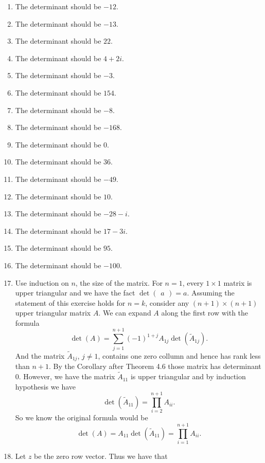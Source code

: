 \begin{enumerate}
\item The determinant should be $-12$.
\item The determinant should be $-13$.
\item The determinant should be $22$.
\item The determinant should be $4+2i$.
\item The determinant should be $-3$.
\item The determinant should be $154$.
\item The determinant should be $-8$.
\item The determinant should be $-168$.
\item The determinant should be $0$.
\item The determinant should be $36$.
\item The determinant should be $-49$.
\item The determinant should be $10$.
\item The determinant should be $-28-i$.
\item The determinant should be $17-3i$.
\item The determinant should be $95$.
\item The determinant should be $-100$.
\item Use induction on $n$, the size of the matrix. For $n=1$, every $1\times 1$ matrix is upper triangular and we have the fact $\det\begin{pmatrix}a\end{pmatrix}=a$. Assuming the statement of this exercise holds for $n=k$, consider any $(n+1)\times (n+1)$ upper triangular matrix $A$. We can expand $A$ along the first row with the formula
\[\det(A)=\sum_{j=1}^{n+1}{(-1)^{1+j}A_{1j}\det(\tilde{A}_{1j})}.\]
And the matrix $\tilde{A}_{1j}$, $j\neq 1$, contains one zero collumn and hence has rank less than $n+1$. By the Corollary after Theorem 4.6 those matrix has determinant $0$. However, we have the matrix $\tilde{A}_{11}$ is upper triangular and by induction hypothesis we have 
\[\det(\tilde{A}_{11})=\prod_{i=2}^{n+1}{A_{ii}}.\]
So we know the original formula would be 
\[\det(A)=A_{11}\det(\tilde{A}_{11})=\prod_{i=1}^{n+1}{A_{ii}}.\]
\item Let $z$ be the zero row vector. Thus we have that 

\end{enumerate}
